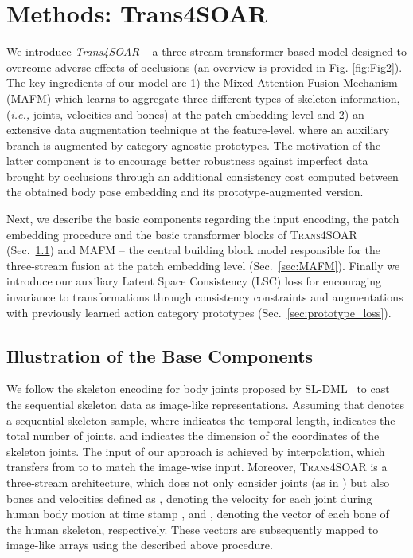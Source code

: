 \documentclass[lettersize,journal]{IEEEtran}
\begin{document}
\section{Methods: Trans4SOAR}
We introduce \textit{Trans4SOAR} -- a three-stream transformer-based model designed to overcome adverse effects of occlusions (an overview is provided in Fig. \ref{fig:Fig2}).
The key ingredients of our model are 1) the
Mixed Attention Fusion Mechanism (MAFM) which learns to aggregate three different types of skeleton information,  (\textit{i.e.,} joints, velocities and bones) at the patch embedding level and 2) an extensive data augmentation technique at the feature-level, where an auxiliary branch is augmented by category agnostic prototypes.
The motivation of the latter component is to encourage better robustness against imperfect data brought by occlusions through an additional consistency cost computed between the obtained body pose embedding and its prototype-augmented version.

Next, we describe the basic components regarding the input encoding, the patch embedding procedure and the basic transformer blocks of \textsc{Trans4SOAR} (Sec.~\ref{sec:components_trans4soar}) and MAFM -- the central building block model responsible for the three-stream fusion at the patch embedding level (Sec.~\ref{sec:MAFM}). 
Finally we introduce our auxiliary Latent Space Consistency (LSC) loss for encouraging invariance to  transformations through consistency constraints and augmentations with previously learned action category prototypes (Sec.~\ref{sec:prototype_loss}). 

\subsection{Illustration of the Base Components}
\label{sec:components_trans4soar}
We follow the skeleton encoding for body joints proposed by SL-DML~\cite{memmesheimer2021sl} to cast the sequential skeleton data as image-like representations.
Assuming that  denotes a sequential skeleton sample, where  indicates the temporal length,  indicates the total number of joints, and  indicates the dimension of the coordinates of the skeleton joints.
The input of our approach is achieved by interpolation, which transfers  from  to  to match the image-wise input.
Moreover,  \textsc{Trans4SOAR} is a three-stream architecture, which does not only consider joints (as in \cite{memmesheimer2021sl}) but also bones  and velocities   defined as , denoting the velocity for each joint during human body motion at time stamp , and , denoting the vector of each bone of the human skeleton, respectively.
These vectors are subsequently mapped to image-like arrays using the described above procedure.
\end{document}
